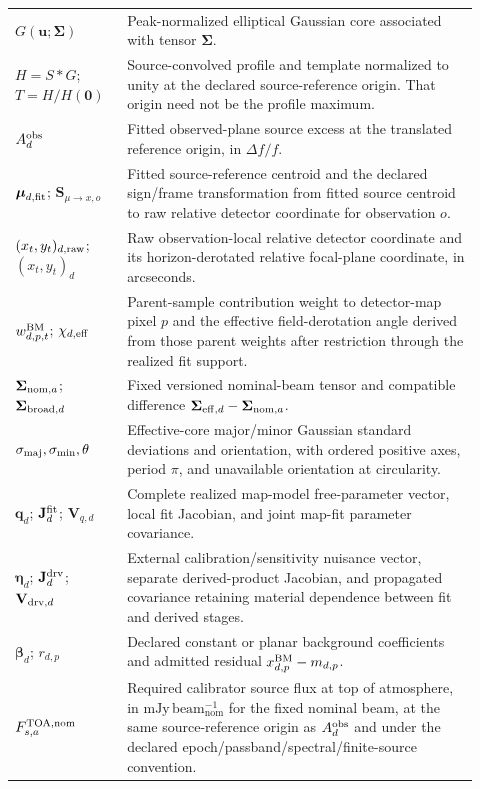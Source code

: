 \begin{longtable}{L{0.22\linewidth}L{0.70\linewidth}}
$G(\mathbf u;\boldsymbol\Sigma)$ & Peak-normalized elliptical Gaussian core associated with tensor $\boldsymbol\Sigma$. \\
$H=S*G$; $T=H/H(\mathbf0)$ & Source-convolved profile and template normalized to unity at the declared source-reference origin. That origin need not be the profile maximum. \\
$A_d^{\rm obs}$ & Fitted observed-plane source excess at the translated reference origin, in $\Delta f/f$. \\
$\boldsymbol\mu_{d,\rm fit}$; $\mathbf S_{\mu\rightarrow x,o}$ & Fitted source-reference centroid and the declared sign/frame transformation from fitted source centroid to raw relative detector coordinate for observation $o$. \\
$(x_t,y_t)_{d,\rm raw}$; $(x_t,y_t)_d$ & Raw observation-local relative detector coordinate and its horizon-derotated relative focal-plane coordinate, in arcseconds. \\
$w^{\rm BM}_{d,p,t}$; $\chi_{d,\rm eff}$ & Parent-sample contribution weight to detector-map pixel $p$ and the effective field-derotation angle derived from those parent weights after restriction through the realized fit support. \\
$\boldsymbol\Sigma_{{\rm nom},a}$; $\boldsymbol\Sigma_{{\rm broad},d}$ & Fixed versioned nominal-beam tensor and compatible difference $\boldsymbol\Sigma_{{\rm eff},d}-\boldsymbol\Sigma_{{\rm nom},a}$. \\
$\sigma_{\rm maj},\sigma_{\rm min},\theta$ & Effective-core major/minor Gaussian standard deviations and orientation, with ordered positive axes, period $\pi$, and unavailable orientation at circularity. \\
$\mathbf q_d$; $\mathbf J^{\rm fit}_d$; $\mathbf V_{q,d}$ & Complete realized map-model free-parameter vector, local fit Jacobian, and joint map-fit parameter covariance. \\
$\boldsymbol\eta_d$; $\mathbf J^{\rm drv}_d$; $\mathbf V_{{\rm drv},d}$ & External calibration/sensitivity nuisance vector, separate derived-product Jacobian, and propagated covariance retaining material dependence between fit and derived stages. \\
$\boldsymbol\beta_d$; $r_{d,p}$ & Declared constant or planar background coefficients and admitted residual $x^{\rm BM}_{d,p}-m_{d,p}$. \\
$F^{\rm TOA,nom}_{s,a}$ & Required calibrator source flux at top of atmosphere, in $\mathrm{mJy\,beam_{nom}^{-1}}$ for the fixed nominal beam, at the same source-reference origin as $A_d^{\rm obs}$ and under the declared epoch/passband/spectral/finite-source convention. \\

\end{longtable}

